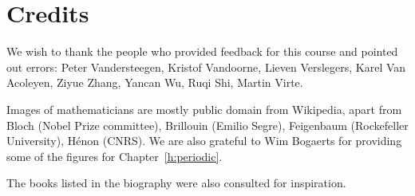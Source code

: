 \chapter{Credits}
\label{h:credits}

We wish to thank the people who provided feedback for this course and pointed out errors: Peter Vandersteegen, Kristof Vandoorne, Lieven Verslegers, Karel Van Acoleyen, Ziyue Zhang, Yancan Wu, Ruqi Shi, Martin Virte.

Images of mathematicians are mostly public domain from Wikipedia, apart from Bloch (Nobel Prize committee), Brillouin (Emilio Segre), Feigenbaum (Rockefeller University), H\'{e}non (CNRS). We are also grateful to Wim Bogaerts for providing some of the figures for Chapter~\ref{h:periodic}.

The books listed in the biography were also consulted for inspiration.

